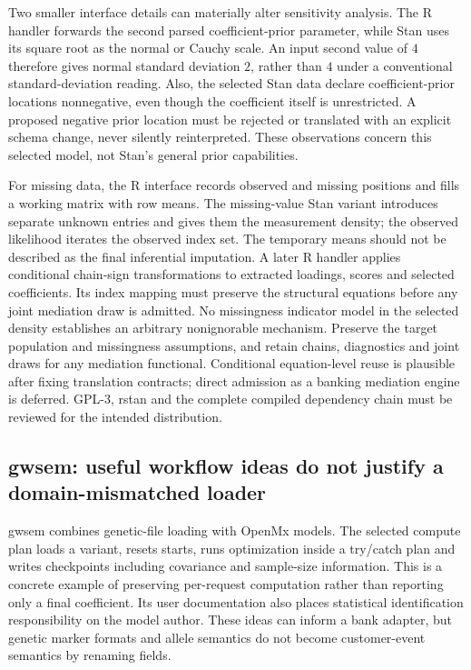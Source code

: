 Two smaller interface details can materially alter sensitivity analysis. The R
handler forwards the second parsed coefficient-prior parameter, while Stan uses
its square root as the normal or Cauchy scale. An input second value of $4$
therefore gives normal standard deviation $2$, rather than $4$ under a
conventional standard-deviation reading. Also, the selected Stan data declare
coefficient-prior locations nonnegative, even though the coefficient itself is
unrestricted. A proposed negative prior location must be rejected or translated
with an explicit schema change, never silently reinterpreted. These observations
concern this selected model, not Stan's general prior capabilities.~\citep{exec25_cmed_bsem}

For missing data, the R interface records observed and missing positions and
fills a working matrix with row means. The missing-value Stan variant introduces
separate unknown entries and gives them the measurement density; the observed
likelihood iterates the observed index set. The temporary means should not be
described as the final inferential imputation. A later R handler applies conditional chain-sign transformations to extracted
loadings, scores and selected coefficients. Its index mapping must preserve the
structural equations before any joint mediation draw is admitted. No missingness
indicator model in the selected density establishes an arbitrary nonignorable
mechanism. Preserve
the target population and missingness assumptions, and retain chains,
diagnostics and joint draws for any mediation functional. Conditional
equation-level reuse is plausible after fixing translation contracts; direct
admission as a banking mediation engine is deferred. GPL-3, rstan and the
complete compiled dependency chain must be reviewed for the intended
distribution.~\citep{exec25_cmed_bsem,exec25_cmed_choice}

\subsection{gwsem: useful workflow ideas do not justify a domain-mismatched loader}

gwsem combines genetic-file loading with OpenMx models. The selected compute plan
loads a variant, resets starts, runs optimization inside a try/catch plan and
writes checkpoints including covariance and sample-size information. This is a
concrete example of preserving per-request computation rather than reporting
only a final coefficient. Its user documentation also places statistical
identification responsibility on the model author. These ideas can inform a
bank adapter, but genetic marker formats and allele semantics do not become
customer-event semantics by renaming fields.~\citep{exec25_cmed_gwsem}

